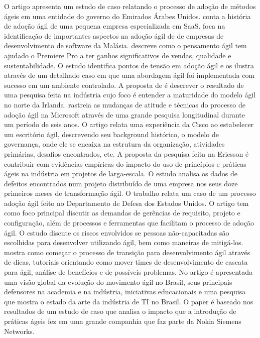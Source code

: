 O artigo \cite{Hajjdiab2011} apresenta um estudo de caso relatando o processo de adoção de métodos ágeis em uma entidade do governo do Emirados Árabes Unidos. \cite{Block2011} conta a história de adoção ágil de uma pequena empresa especializada em SaaS. \cite{Asnawi2012} foca na identificação de importantes aspectos na adoção ágil de de empresas de desenvolvimento de software da Malásia. \cite{Adobe2012} descreve como o pensamento ágil tem ajudado o Premiere Pro a ter ganhos significativos de vendas, qualidade e sustentabilidade. O estudo \cite{Fitzgerald2013} identifica pontos de tensão em adoção ágil e os ilustra através de um detalhado caso em que uma abordagem ágil foi implementada com sucesso em um ambiente controlado. A proposta de \cite{Bustard2013} é descrever o resultado de uma pesquisa feita na indústria cujo foco é entender a maturidade do modelo ágil no norte da Irlanda. \cite{Microsoft2013} rastreia as mudanças de atitude e técnicas do processo de adoção ágil na Microsoft através de uma grande pesquisa longitudinal durante um período de seis anos. O artigo \cite{Cisco2011} relata uma experiência da Cisco ao estabelecer um escritório ágil, descrevendo seu background histórico, o modelo de governança, onde ele se encaixa na estrutura da organização, atividades primárias, desafios encontrados, etc. A proposta da pesquisa \cite{Ericsson2013} feita na Ericsson é contribuir com evidências empíricas do impacto do uso de princípios e práticas ágeis na indústria em projetos de larga-escala. O estudo \cite{Korhonen2010} analisa os dados de defeitos encontrados num projeto distribuído de uma empresa nos seus doze primeiros meses de transformação ágil. O trabalho \cite{Lapham2012} relata um caso de um processo adoção ágil feito no Departamento de Defesa dos Estados Unidos. O artigo \cite{Arikpo2011} tem como foco principal discutir as demandas de gerências de requisito, projeto e configuração, além de processos e ferramentas que facilitam o processo de adoção ágil. O estudo \cite{Radha2012} discute os riscos envolvidos se pessoas não-capacitadas são escolhidas para desenvolver utilizando ágil, bem como maneiras de mitigá-los. \cite{Eunha2012} mostra como começar o processo de transição para desenvolvimento ágil através de dicas, tutoriais orientando como mover times de desenvolvimento de cascata para ágil, análise de benefícios e de possíveis problemas. No artigo \cite{Claudia2013} é apresentada uma visão global da evolução do movimento ágil no Brasil, seus principais defensores na academia e na indústria, iniciativas educacionais e uma pesquisa que mostra o estado da arte da indústria de TI no Brasil. O paper \cite{Nokia2013} é baseado nos resultados de um estudo de caso que analisa o impacto que a introdução de práticas ágeis fez em uma grande companhia que faz parte da Nokia Siemens Networks.

